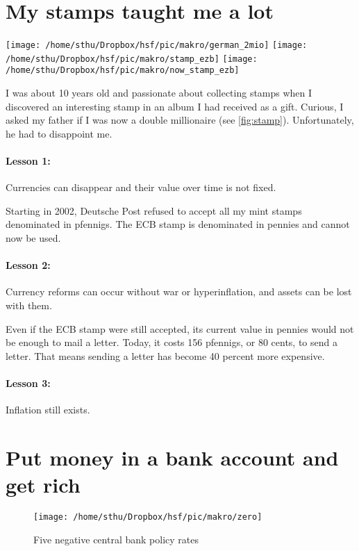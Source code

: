\section{My stamps taught me a lot}

\begin{center}
\texttt{[image: /home/sthu/Dropbox/hsf/pic/makro/german\_2mio]}
\texttt{[image: /home/sthu/Dropbox/hsf/pic/makro/stamp\_ezb]}
\texttt{[image: /home/sthu/Dropbox/hsf/pic/makro/now\_stamp\_ezb]}
\label{fig:stamp}

\end{center}

I was about 10 years old and passionate about collecting stamps when I discovered an interesting stamp in an album I had received as a gift. Curious, I asked my father if I was now a double millionaire (see \autoref{fig:stamp}). Unfortunately, he had to disappoint me. 
\paragraph{Lesson 1:} Currencies can disappear and their value over time is not fixed.

Starting in 2002, Deutsche Post refused to accept all my mint stamps denominated in pfennigs. The ECB stamp is denominated in pennies and cannot now be used.
\paragraph{Lesson 2:} Currency reforms can occur without war or hyperinflation, and assets can be lost with them. 

Even if the ECB stamp were still accepted, its current value in pennies would not be enough to mail a letter. Today, it costs 156 pfennigs, or 80 cents, to send a letter. That means sending a letter has become 40 percent more expensive. 
\paragraph{Lesson 3:} Inflation still exists.


\section{Put money in a bank account and get rich}

\begin{figure}
	\begin{center}
		\texttt{[image: /home/sthu/Dropbox/hsf/pic/makro/zero]}
	\end{center}
	\caption{Five negative central bank policy rates}\label{fig:fivenegative}
\end{figure}

